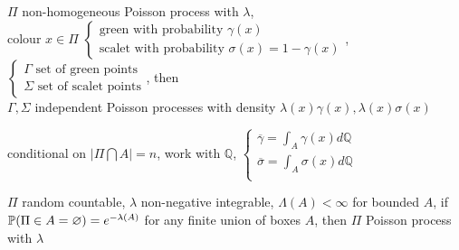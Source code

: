 \begin{thm}
    $\Pi$ non-homogeneous Poisson process with $\lambda$,\\ colour $x \in \Pi$ $\begin{cases}
              \text{green with probability } \gamma(x)\\
              \text{scalet with probability } \sigma(x) = 1- \gamma(x)
    \end{cases}$, $\begin{cases}
                 \Gamma \text{ set of green points}\\
                 \Sigma \text{ set of scalet points}
    \end{cases}$, then\\ $\Gamma, \Sigma$ independent Poisson processes with density $\lambda(x)\gamma(x), \lambda(x)\sigma(x)$
\end{thm}
\begin{pf}
    conditional on $|\Pi \bigcap A| = n$, work with $\mathbb{Q}$, $\begin{cases}
                                                                       \overline{\gamma} = \int_A \gamma(x)d\mathbb{Q}\\
                                                                       \overline{\sigma} = \int_A \sigma(x)d\mathbb{Q}\\
    \end{cases}$
\end{pf}

\begin{thm}
    $\Pi$ random countable, $\lambda$ non-negative integrable, $\Lambda(A) < \infty$ for bounded $A$, if $\mathbb{P}(\Pi \in A = \varnothing) = e^{-\lambda(A)}$ for any finite union of boxes $A$,
    then $\Pi$ Poisson process with $\lambda$
\end{thm}

